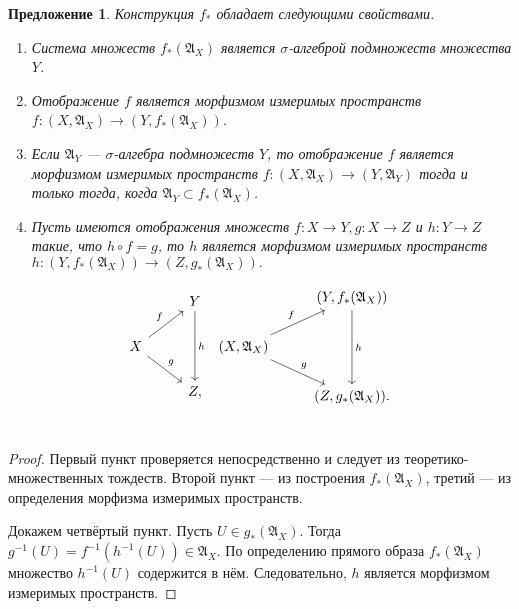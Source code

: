 \documentclass[12pt]{article}
\newtheorem{proposition}[theorem]{Предложение}
\numberwithin{theorem}{section}
\theoremstyle{definition}
\newcommand{\setsigmaalg}{\mathfrak{A}}
\begin{document}
	\begin{proposition} \label{direct image of sigma algebra}
		Конструкция $ f_{*} $ обладает следующими свойствами.
		\begin{enumerate}
			\item Система множеств $ f_{*}(\setsigmaalg_X) $ является $ \sigma $-алгеброй подмножеств множества $ Y $.
			\item Отображение $ f $ является морфизмом измеримых пространств $ f \colon (X, \setsigmaalg_X) \to (Y, f_{*}(\setsigmaalg_X)) $.
			\item Если $ \setsigmaalg_Y $ --- $ \sigma $-алгебра подмножеств $ Y $,
			то отображение $ f $ является морфизмом измеримых пространств $ f \colon (X, \setsigmaalg_X) \to (Y, \setsigmaalg_Y) $
			тогда и только тогда, когда $ \setsigmaalg_Y \subset f_{*}(\setsigmaalg_X) $.
			\item Пусть имеются отображения множеств $ f \colon X \to Y, g \colon X \to Z $ и $ h \colon Y \to Z $
			такие, что $ h \circ f = g $, то $ h $ является морфизмом измеримых пространств
			$ h \colon (Y, f_{*}(\setsigmaalg_X)) \to (Z, g_{*}(\setsigmaalg_X)). $
		\end{enumerate}
		$$ \begin{tikzcd}
			 & Y \ar{dd}{h} \\
			X \ar{ru}{f} \ar{rd}{g} &  \\
			& Z, \\
		\end{tikzcd} \
		\begin{tikzcd}
			& (Y, f_{*}(\setsigmaalg_X)) \ar{dd}{h} \\
			(X, \setsigmaalg_X) \ar{ru}{f} \ar{rd}{g} &  \\
			& (Z, g_{*}(\setsigmaalg_X)). \\
		\end{tikzcd} $$
	\end{proposition}
	
	\begin{proof}
		Первый пункт проверяется непосредственно и следует из теоретико-множественных тождеств.
		Второй пункт --- из построения $ f_{*}(\setsigmaalg_X) $, третий --- из определения морфизма измеримых пространств.
		
		Докажем четвёртый пункт. Пусть $ U \in g_*(\setsigmaalg_X) $. Тогда $ g^{-1}(U) = f^{-1}(h^{-1}(U)) \in \setsigmaalg_X $.
		По определению прямого образа $ f_*(\setsigmaalg_X) $ множество $ h^{-1}(U) $ содержится в нём.
		Следовательно, $ h $ является морфизмом измеримых пространств.
	\end{proof}
	
\end{document}
